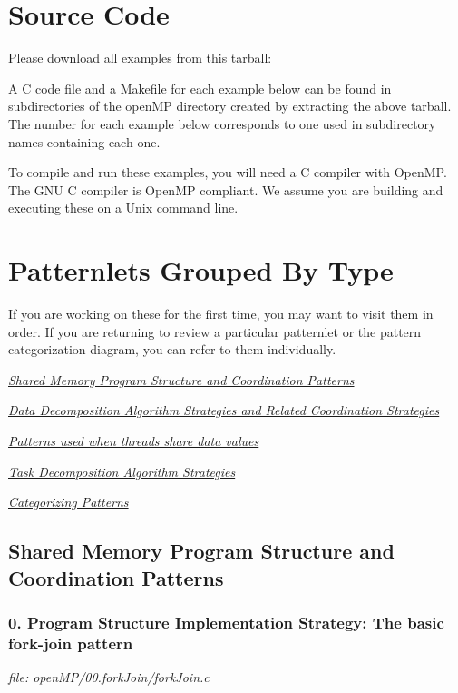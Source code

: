 \documentclass[letterpaper,10pt,openany,oneside]{sphinxmanual}
\begin{document}
\section{Source Code}
\label{SharedMemory/OpenMP_Patternlets:source-code}
Please download all examples from this tarball:

A C code file and a Makefile for each example below can be found in
subdirectories of the openMP directory created by extracting the above tarball.
The number for each example below corresponds to one used in subdirectory
names containing each one.

To compile and run these examples, you will need a C compiler with OpenMP.  The GNU C compiler is OpenMP compliant.  We assume you are building and executing these on a Unix command line.


\section{Patternlets Grouped By Type}
\label{SharedMemory/OpenMP_Patternlets:patternlets-grouped-by-type}
If you are working on these for the first time, you may want to visit them in order.  If you are returning to review a particular patternlet or the pattern categorization diagram, you can refer to them individually.

{\hyperref[SharedMemory/ProgStructure_Barrier::doc]{\emph{Shared Memory Program Structure and Coordination Patterns}}}

{\hyperref[SharedMemory/DataDecomp_Reduction::doc]{\emph{Data Decomposition Algorithm Strategies and Related Coordination Strategies}}}

{\hyperref[SharedMemory/MutualExclusion::doc]{\emph{Patterns used when threads share data values}}}

{\hyperref[SharedMemory/TaskDecomp::doc]{\emph{Task Decomposition Algorithm Strategies}}}

{\hyperref[SharedMemory/patterns_diagram::doc]{\emph{Categorizing Patterns}}}


\subsection{Shared Memory Program Structure and Coordination Patterns}
\label{SharedMemory/ProgStructure_Barrier:shared-memory-program-structure-and-coordination-patterns}\label{SharedMemory/ProgStructure_Barrier::doc}

\subsubsection{0. Program Structure Implementation Strategy: The basic fork-join pattern}
\label{SharedMemory/ProgStructure_Barrier:program-structure-implementation-strategy-the-basic-fork-join-pattern}
\emph{file: openMP/00.forkJoin/forkJoin.c}
\end{document}
